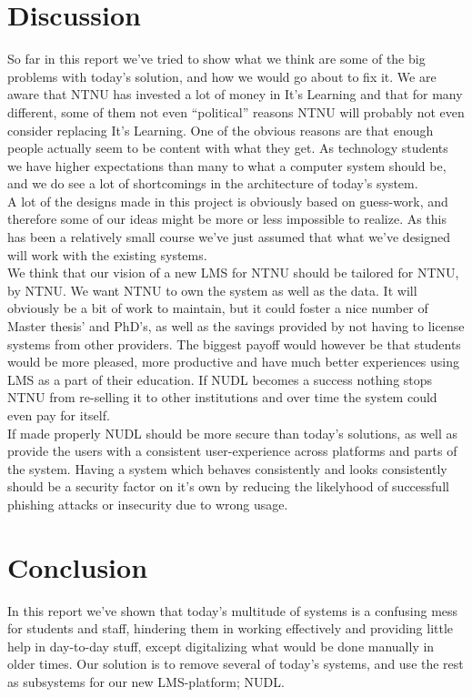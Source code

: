 \section{Discussion}

So far in this report we've tried to show what we think are some of the big problems with today's solution, and how we would go about to fix it. We are aware that NTNU
has invested a lot of money in It's Learning and that for many different, some of them not even ``political'' reasons NTNU will probably not even consider replacing It's Learning. One 
of the obvious reasons are that enough people actually seem to be content with what they get. As technology students we have higher expectations than many to what a computer system should be, and we do see a lot of shortcomings in the architecture of today's system.\\

\noindent
A lot of the designs made in this project is obviously based on guess-work, and therefore some of our ideas might be more or less impossible to realize. As this has been a relatively small course we've just assumed that what we've designed will work with the existing systems. \\

\noindent
We think that our vision of a new LMS for NTNU should be tailored for NTNU, by NTNU. We want NTNU to own the system as well as the data. It will obviously be a bit of work to 
maintain, but it could foster a nice number of Master thesis' and PhD's, as well as the savings provided by not having to license systems from other providers. The biggest payoff 
would however be that students would be more pleased, more productive and have much better experiences using LMS as a part of their education. If NUDL becomes a success nothing stops 
NTNU from re-selling it to other institutions and over time the system could even pay for itself.\\

\noindent
If made properly NUDL should be more secure than today's solutions, as well as provide the users with a consistent user-experience across platforms and parts of the system. Having a 
system which behaves consistently and looks consistently should be a security factor on it's own by reducing the likelyhood of successfull phishing attacks or insecurity due to wrong 
usage. 


\newpage
\section{Conclusion}
In this report we've shown that today's multitude of systems is a confusing mess for students and staff, hindering them in working effectively and providing little help in day-to-day 
stuff, except digitalizing what would be done manually in older times. Our solution is to remove several of today's systems, and use the rest as subsystems for our new LMS-platform; NUDL. \\

